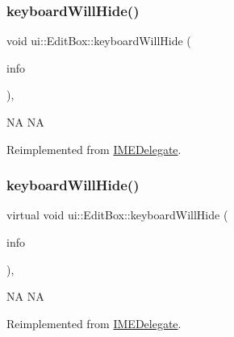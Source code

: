 \subsubsection{\texorpdfstring{keyboard\+Will\+Hide()}{keyboardWillHide()}\hspace{0.1cm}{\footnotesize\ttfamily [1/2]}}
{\footnotesize\ttfamily void ui\+::\+Edit\+Box\+::keyboard\+Will\+Hide (\begin{DoxyParamCaption}\item[{\hyperlink{structIMEKeyboardNotificationInfo}{I\+M\+E\+Keyboard\+Notification\+Info} \&}]{info }\end{DoxyParamCaption})\hspace{0.3cm}{\ttfamily [override]}, {\ttfamily [virtual]}}

NA  NA 

Reimplemented from \hyperlink{classIMEDelegate_a576cd6b268dfab44836f74183cb76f06}{I\+M\+E\+Delegate}.

\mbox{\label{classui_1_1EditBox_aabf158a71e53e27677d85b86e9aa4e3a}} 
\subsubsection{\texorpdfstring{keyboard\+Will\+Hide()}{keyboardWillHide()}\hspace{0.1cm}{\footnotesize\ttfamily [2/2]}}
{\footnotesize\ttfamily virtual void ui\+::\+Edit\+Box\+::keyboard\+Will\+Hide (\begin{DoxyParamCaption}\item[{\hyperlink{structIMEKeyboardNotificationInfo}{I\+M\+E\+Keyboard\+Notification\+Info} \&}]{info }\end{DoxyParamCaption})\hspace{0.3cm}{\ttfamily [override]}, {\ttfamily [virtual]}}

NA  NA 

Reimplemented from \hyperlink{classIMEDelegate_a576cd6b268dfab44836f74183cb76f06}{I\+M\+E\+Delegate}.

\mbox{\label{classui_1_1EditBox_abc522ffb60d7bb59404be9584fc1f60c}} 
